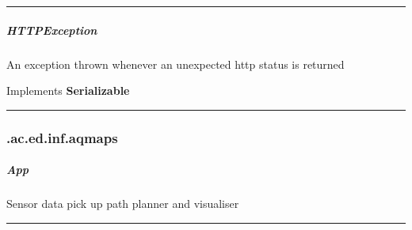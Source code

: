 \hrule
\begin{mitem}
\scriptsize
	{}
\end{mitem}

\subparagraph{ HTTPException } An exception thrown whenever an unexpected http status is returned
 
Implements \textbf{ Serializable }
\hrule
\begin{mitem}
\scriptsize
	{}
\end{mitem}

\subsubsection{ .ac.ed.inf.aqmaps }
\subparagraph{ App } Sensor data pick up path planner and visualiser
 
\hrule
\begin{mitem}
\scriptsize
	{}
	{}
\end{mitem}

